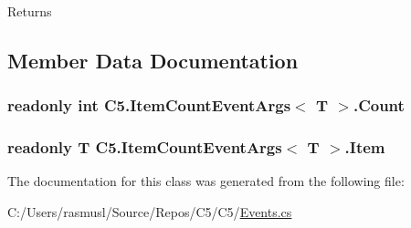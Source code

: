 \begin{DoxyReturn}{Returns}

\end{DoxyReturn}


\subsection{Member Data Documentation}
\hypertarget{class_c5_1_1_item_count_event_args_a7038a3e4072fd1c92730447832690ab3}{}
\subsubsection[{Count}]{\setlength{\rightskip}{0pt plus 5cm}readonly int {\bf C5.\+Item\+Count\+Event\+Args}$<$ T $>$.Count}\label{class_c5_1_1_item_count_event_args_a7038a3e4072fd1c92730447832690ab3}




\hypertarget{class_c5_1_1_item_count_event_args_aa2cebc5c33bea75a4891fe7f1a4ee4da}{}
\subsubsection[{Item}]{\setlength{\rightskip}{0pt plus 5cm}readonly T {\bf C5.\+Item\+Count\+Event\+Args}$<$ T $>$.Item}\label{class_c5_1_1_item_count_event_args_aa2cebc5c33bea75a4891fe7f1a4ee4da}






The documentation for this class was generated from the following file\+:\begin{DoxyCompactItemize}
\item 
C\+:/\+Users/rasmusl/\+Source/\+Repos/\+C5/\+C5/\hyperlink{_events_8cs}{Events.\+cs}\end{DoxyCompactItemize}
